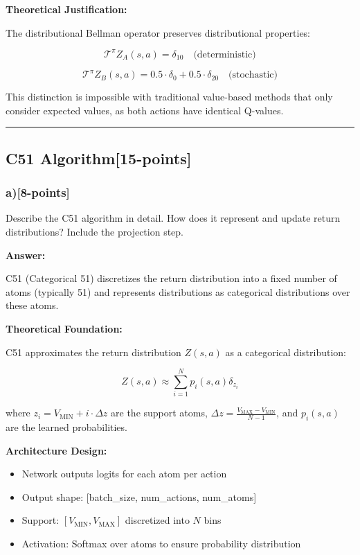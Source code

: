 \documentclass[12pt]{article}
\begin{document}
{{\textbf{Theoretical Justification:}

The distributional Bellman operator preserves distributional properties:

\begin{equation}
\mathcal{T}^\pi Z_A(s,a) = \delta_{10} \quad \text{(deterministic)}
\end{equation}

\begin{equation}
\mathcal{T}^\pi Z_B(s,a) = 0.5 \cdot \delta_0 + 0.5 \cdot \delta_{20} \quad \text{(stochastic)}
\end{equation}

This distinction is impossible with traditional value-based methods that only consider expected values, as both actions have identical Q-values.

\noindent\rule{\textwidth}{0.2pt}

\subsection{C51 Algorithm[15-points]}
\subsubsection{a)[8-points]} Describe the C51 algorithm in detail. How does it represent and update return distributions? Include the projection step.

\textbf{Answer:}

C51 (Categorical 51) discretizes the return distribution into a fixed number of atoms (typically 51) and represents distributions as categorical distributions over these atoms.

\textbf{Theoretical Foundation:}

C51 approximates the return distribution $Z(s,a)$ as a categorical distribution:

\begin{equation}
Z(s,a) \approx \sum_{i=1}^{N} p_i(s,a) \delta_{z_i}
\end{equation}

where $z_i = V_{\text{MIN}} + i \cdot \Delta z$ are the support atoms, $\Delta z = \frac{V_{\text{MAX}} - V_{\text{MIN}}}{N-1}$, and $p_i(s,a)$ are the learned probabilities.

\textbf{Architecture Design:}
\begin{itemize}
\item Network outputs logits for each atom per action
\item Output shape: [batch\_size, num\_actions, num\_atoms]
\item Support: $[V_{\text{MIN}}, V_{\text{MAX}}]$ discretized into $N$ bins
\item Activation: Softmax over atoms to ensure probability distribution
\end{itemize}

}}
\end{document}
